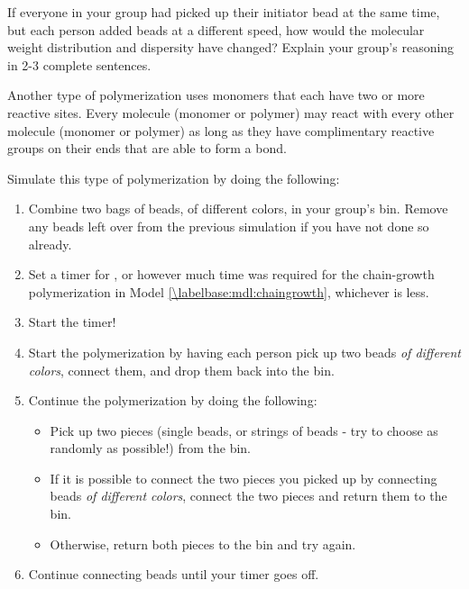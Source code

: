 \begin{activity}
\begin{ctqs}
		\begin{solution}[2in]
		\end{solution}
	
	\question If everyone in your group had picked up their initiator bead at the same time, but each person added beads at a different speed, how would the molecular weight distribution and dispersity have changed?  Explain your group's reasoning in 2-3 complete sentences.
	
		\begin{solution}[2in]
		\end{solution}
		
\end{ctqs}

\begin{model}
\label{\labelbase:mdl:stepgrowth}

	Another type of polymerization uses monomers that each have two or more reactive sites.  Every molecule (monomer or polymer) may react with every other molecule (monomer or polymer) as long as they have complimentary reactive groups on their ends that are able to form a bond.
	
	Simulate this type of polymerization by doing the following:
	\begin{enumerate}
		\item Combine two bags of beads, of different colors, in your group's bin.  Remove any beads left over from the previous simulation if you have not done so already.
		\item Set a timer for \timeallowed, or however much time was required for the chain-growth polymerization in Model \ref{\labelbase:mdl:chaingrowth}, whichever is less.
		\item Start the timer!
		\item Start the polymerization by having each person pick up two beads \emph{of different colors}, connect them, and drop them back into the bin.
		\item Continue the polymerization by doing the following:
			\begin{itemize}
				\item Pick up two pieces (single beads, or strings of beads - try to choose as randomly as possible!) from the bin.
				\item If it is possible to connect the two pieces you picked up by connecting beads \emph{of different colors}, connect the two pieces and return them to the bin.
				\item Otherwise, return both pieces to the bin and try again.
			\end{itemize}
		\item Continue connecting beads until your timer goes off.
	\end{enumerate}
	

\end{model}
\end{activity}
